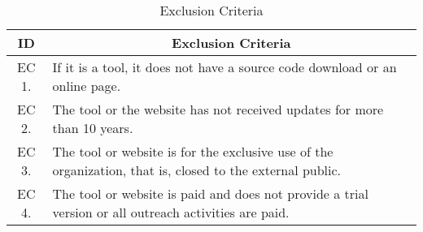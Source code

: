 \begin{table}
  \centering
  \caption{Exclusion Criteria}
  \label{tbl:gl-exclusion-criteria}
  \footnotesize
  \begin{tabular}{c|p{12cm}}
    \bottomrule
    \rowcolor[rgb]{0.753,0.753,0.753} \textbf{ID} & \multicolumn{1}{c}{\textbf{Exclusion Criteria}}                                                           \\
    \hline
    \rowcolor[rgb]{0.898,0.898,0.898} EC 1.       & If it is a tool, it does not have a source code download or an online page.                               \\
    EC 2.                                         & The tool or the website has not received updates for more than 10 years.                                  \\
    \rowcolor[rgb]{0.898,0.898,0.898} EC 3.       & The tool or website is for the exclusive use of the organization, that is, closed to the external public. \\
    EC 4.                                         & The tool or website is paid and does not provide a trial version or all outreach activities are paid.     \\
    \toprule
  \end{tabular}
\end{table}